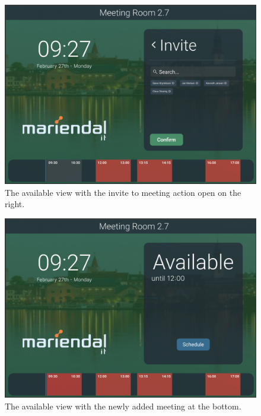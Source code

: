   \begin{figure}[h!]
    \centering
    \includegraphics[width=1\textwidth]{images/available_search.png}
    \caption{The available view with the invite to meeting action open on the right.}
    \label{fig:available_search}
  \end{figure}

  \begin{figure}[h!]
    \centering
    \includegraphics[width=1\textwidth]{images/available_added.png}
    \caption{The available view with the newly added meeting at the bottom.}
    \label{fig:available_added}
  \end{figure}

